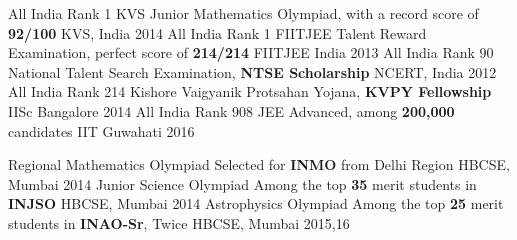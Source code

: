 \begin{cvhonors}
  \cvhonor
    {All India Rank 1}
    {KVS Junior Mathematics Olympiad, with a record score of \textbf{92/100}}
    {KVS, India}
    {2014}
  \cvhonor
    {All India Rank 1}
    {FIITJEE Talent Reward Examination, perfect score of \textbf{214/214}}
    {FIITJEE India}
    {2013}
  \cvhonor
    {All India Rank 90}
    {National Talent Search Examination, \textbf{NTSE Scholarship}}
    {NCERT, India}
    {2012}
  \cvhonor
    {All India Rank 214}
    {Kishore Vaigyanik Protsahan Yojana, \textbf{KVPY Fellowship}}
    {IISc Bangalore}
    {2014}
  \cvhonor
    {All India Rank 908}
    {JEE Advanced, among \textbf{200,000} candidates}
    {IIT Guwahati}
    {2016}
\end{cvhonors}

\begin{cvhonors}
  \cvhonor
    {Regional Mathematics Olympiad}
    {Selected for \textbf{INMO} from Delhi Region}
    {HBCSE, Mumbai}
    {2014}
  \cvhonor
    {Junior Science Olympiad}
    {Among the top \textbf{35} merit students in \textbf{INJSO} }
    {HBCSE, Mumbai}
    {2014}
  \cvhonor
    {Astrophysics Olympiad}
    {Among the top \textbf{25} merit students in \textbf{INAO-Sr}, Twice}
    {HBCSE, Mumbai}
    {2015,16}
\end{cvhonors}

